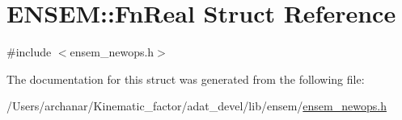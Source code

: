 \hypertarget{structENSEM_1_1FnReal}{}\section{E\+N\+S\+EM\+:\+:Fn\+Real Struct Reference}
\label{structENSEM_1_1FnReal}


{\ttfamily \#include $<$ensem\+\_\+newops.\+h$>$}



The documentation for this struct was generated from the following file\+:\begin{DoxyCompactItemize}
\item 
/\+Users/archanar/\+Kinematic\+\_\+factor/adat\+\_\+devel/lib/ensem/\mbox{\hyperlink{lib_2ensem_2ensem__newops_8h}{ensem\+\_\+newops.\+h}}\end{DoxyCompactItemize}
